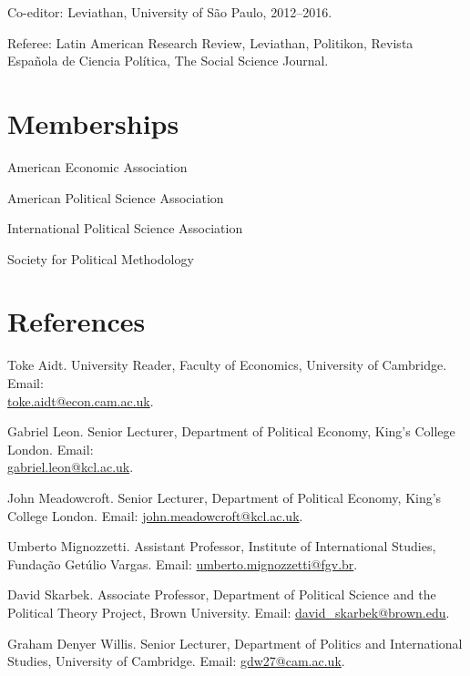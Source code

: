 \documentclass[a4paper]{article}
\renewenvironment{itemize}{
	\begin{list}{}{
			\setlength{\leftmargin}{1.5em}
		}
		}{
	\end{list}
}
\begin{document}
	\begin{itemize}
		\item Co-editor: Leviathan, University of São Paulo, 2012--2016.
		\item Referee: Latin American Research Review, Leviathan, Politikon, Revista Española de Ciencia Política, The Social Science Journal.
	\end{itemize}

	\section*{Memberships}

	\begin{itemize}
		\item American Economic Association
		\item American Political Science Association
		\item International Political Science Association
		\item Society for Political Methodology
	\end{itemize}

	\section*{References}

	\begin{itemize}

		\item Toke Aidt. University Reader, Faculty of Economics, University of Cambridge. Email: \\ \href{mailto:toke.aidt@econ.cam.ac.uk}{toke.aidt@econ.cam.ac.uk}.
		\item Gabriel Leon. Senior Lecturer, Department of Political Economy, King's College London. Email: \\ \href{mailto:gabriel.leon@kcl.ac.uk}{gabriel.leon@kcl.ac.uk}.
		\item John Meadowcroft. Senior Lecturer, Department of Political Economy, King's College London. Email: \href{mailto:john.meadowcroft@kcl.ac.uk}{john.meadowcroft@kcl.ac.uk}.
		\item Umberto Mignozzetti. Assistant Professor, Institute of International Studies, Funda\c{c}\~{a}o Get\'{u}lio Vargas. Email: \href{umberto.mignozzetti@fgv.br}{umberto.mignozzetti@fgv.br}.
		\item David Skarbek. Associate Professor, Department of Political Science and the Political Theory Project, Brown University. Email: \href{mailto:davidskarbek@gmail.com}{david\_skarbek@brown.edu}.
		\item Graham Denyer Willis. Senior Lecturer, Department of Politics and International Studies, University of Cambridge. Email: \href{mailto:gdw27@cam.ac.uk}{gdw27@cam.ac.uk}.
	\end{itemize}

	\bigskip


	
\end{document}
